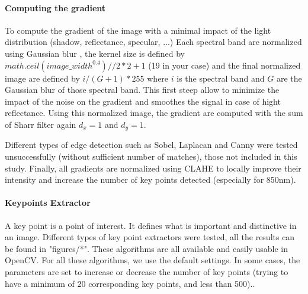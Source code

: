 \documentclass[]{elsarticle}
\begin{document}
	\paragraph{Computing the gradient} To compute the gradient of the image with a minimal impact of the light distribution (shadow, reflectance, specular, ...)
	Each spectral band are normalized using Gaussian blur \cite{sage0303}, the kernel size is defined by $math.ceil(image\_width^{0.4}) // 2 * 2 +1$ (19 in your case)
	and the final normalized image are defined by $i/(G+1)*255$ where $i$ is the spectral band and $G$ are the Gaussian blur of those spectral band.
	This first steep allow to minimize the impact of the noise on the gradient and smoothes the signal in case of hight reflectance.
	Using this normalized image, the gradient are computed with the sum of Sharr filter \cite{Seitz} again $d_x=1$ and $d_y=1$.
	
	Different types of edge detection such as Sobel, Laplacan and Canny were tested unsuccessfully (without sufficient number of matches), those not included in this study. Finally, all gradients are normalized using CLAHE \cite{zuiderveld1994contrast} to locally improve their intensity and increase the number of key points detected (especially for 850nm).
	
	\paragraph{Keypoints Extractor}
	A key point is a point of interest. It defines what is important and distinctive in an image.
	Different types of key point extractors were tested, all the results can be found in "figures/*".
	These algorithms are all available and easily usable in OpenCV.
	For all these algorithms, we use the default settings.
	In some cases, the parameters are set to increase or decrease the number of key points
	(trying to have a minimum of 20 corresponding key points, and less than 500)..
	
\end{document}

